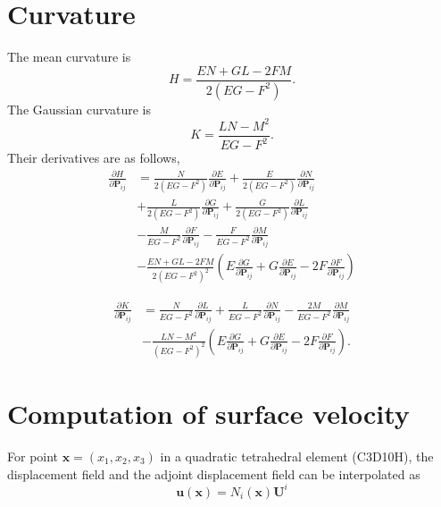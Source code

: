 \documentclass[journal]{IEEEtran}
\renewcommand{\vec}[1]{\mathbf{#1}}
\theoremstyle{definition}
\renewcommand{\vec}[1]{\mathbf{#1}}
\begin{document}
\section{Curvature}
\label{appendix_Curvature}
The mean curvature is
\begin{equation}
  H = \frac{EN+GL-2FM}{2\left(EG-F^2\right)}.
\end{equation}
The Gaussian curvature is
\begin{equation}
  K = \frac{LN-M^2}{EG-F^2}.
\end{equation}
Their derivatives are as follows,
\begin{equation}
  \begin{split}
    \frac{\partial H}{\partial \mathbf{P}_{ij}} &= \frac{N}{2\left(EG-F^2\right)}\frac{\partial E}{\partial \mathbf{P}_{ij}}+\frac{E}{2\left(EG-F^2\right)}\frac{\partial N}{\partial \mathbf{P}_{ij}}\\
    &+ \frac{L}{2\left(EG-F^2\right)}\frac{\partial G}{\partial \mathbf{P}_{ij}} + \frac{G}{2\left(EG-F^2\right)}\frac{\partial L}{\partial \mathbf{P}_{ij}} \\
    &- \frac{M}{EG-F^2}\frac{\partial F}{\partial \mathbf{P}_{ij}} - \frac{F}{EG-F^2}\frac{\partial M}{\partial \mathbf{P}_{ij}}\\
    &- \frac{EN+GL-2FM}{2\left(EG-F^2\right)^2} \left(E\frac{\partial G}{\partial \mathbf{P}_{ij}} + G\frac{\partial E}{\partial \mathbf{P}_{ij}} - 2F\frac{\partial F}{\partial \mathbf{P}_{ij}}\right)
  \end{split}
\end{equation}

\begin{equation}
  \begin{split}
    \frac{\partial K}{\partial \mathbf{P}_{ij}} &= \frac{N}{EG-F^2}\frac{\partial L}{\partial \mathbf{P}_{ij}}+\frac{L}{EG-F^2}\frac{\partial N}{\partial \mathbf{P}_{ij}} - \frac{2M}{EG-F^2} \frac{\partial M}{\partial \mathbf{P}_{ij}} \\
    &- \frac{LN-M^2}{\left(EG-F^2\right)^2} \left(E\frac{\partial G}{\partial \mathbf{P}_{ij}} + G\frac{\partial E}{\partial \mathbf{P}_{ij}} - 2F\frac{\partial F}{\partial \mathbf{P}_{ij}}\right).
  \end{split}
\end{equation}

\section{Computation of surface velocity}
\label{appendix_Interpolation}
For point $\vec{x}=\left(x_1, x_2, x_3\right)$ in a quadratic tetrahedral element (C3D10H), the displacement field and the adjoint displacement field can be interpolated as
\begin{equation}
  \vec{u}\left(\vec{x}\right) = N_i\left(\vec{x}\right) \vec{U}^i
\end{equation}
\end{document}

